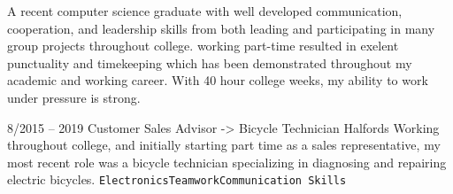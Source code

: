 \documentclass[9pt]{developercv} %
\begin{document}
\vspace{0.5cm}



\begin{minipage}[t]{0.45\textwidth} %
	\vspace{-\baselineskip} %
	A recent computer science graduate with well developed communication, cooperation, and leadership skills from both leading and participating in many
group projects throughout college. 
working part-time resulted in exelent punctuality and timekeeping which has been
demonstrated throughout my academic and working
career. With 40 hour college weeks, my ability to work
under pressure is strong.
\end{minipage}
\hfill %
\begin{minipage}[t]{0.45\textwidth} %
	\vspace{-\baselineskip} %
	\begin{barchart}{5.5}
		
		

	\end{barchart}
\end{minipage}




\begin{entrylist}
	\entry
		{8/2015 -- 2019}
		{Customer Sales Advisor -> Bicycle Technician}
		{Halfords}
		{Working throughout college, and initially starting part time as a sales representative, my most
recent role was a bicycle technician specializing in diagnosing and repairing electric bicycles.
 \texttt{Electronics}\slashsep\texttt{Teamwork}\slashsep\texttt{Communication Skills}}
	
\end{entrylist}
\end{document}
